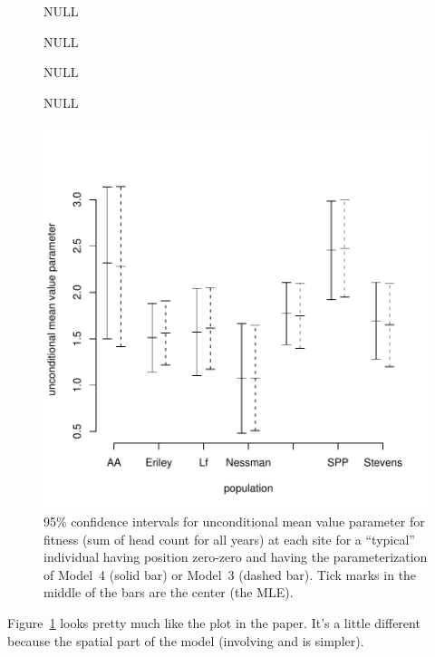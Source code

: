 \documentclass[11pt]{article}
\begin{document}
\begin{figure}
\begin{center}
\begin{Schunk}
\begin{Soutput}
NULL
\end{Soutput}
\begin{Soutput}
NULL
\end{Soutput}
\begin{Soutput}
NULL
\end{Soutput}
\begin{Soutput}
NULL
\end{Soutput}
\end{Schunk}
\includegraphics{tutor-fig1}
\end{center}
\caption{95\% confidence intervals for unconditional
mean value parameter for fitness (sum of head count for all years) at each
site for a ``typical'' individual having position zero-zero and having
the parameterization of Model~4 (solid bar) or Model~3 (dashed bar).
Tick marks in the middle of the bars are the center (the MLE).}
\label{fig:one}
\end{figure}

Figure~\ref{fig:one} looks pretty much like the plot in the paper.
It's a little different because the spatial part of the model (involving
\verb@ewloc@ and \verb@nsloc@ is simpler).
\end{document}
